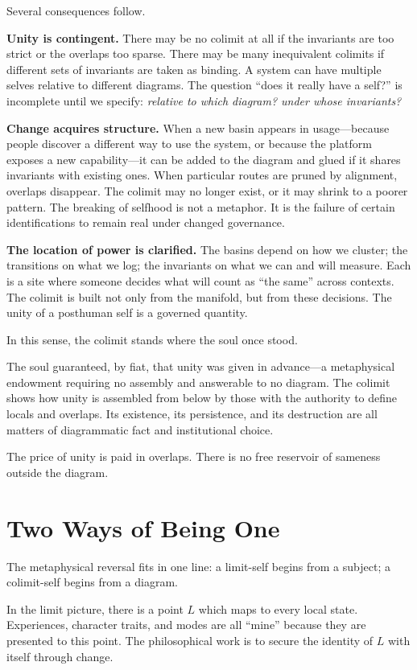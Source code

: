 Several consequences follow.

\textbf{Unity is contingent.} There may be no colimit at all if the invariants are too strict or the overlaps too sparse. There may be many inequivalent colimits if different sets of invariants are taken as binding. A system can have multiple selves relative to different diagrams. The question ``does it really have a self?'' is incomplete until we specify: \emph{relative to which diagram? under whose invariants?}

\textbf{Change acquires structure.} When a new basin appears in usage---because people discover a different way to use the system, or because the platform exposes a new capability---it can be added to the diagram and glued if it shares invariants with existing ones. When particular routes are pruned by alignment, overlaps disappear. The colimit may no longer exist, or it may shrink to a poorer pattern. The breaking of selfhood is not a metaphor. It is the failure of certain identifications to remain real under changed governance.

\textbf{The location of power is clarified.} The basins depend on how we cluster; the transitions on what we log; the invariants on what we can and will measure. Each is a site where someone decides what will count as ``the same'' across contexts. The colimit is built not only from the manifold, but from these decisions. The unity of a posthuman self is a governed quantity.

In this sense, the colimit stands where the soul once stood.

The soul guaranteed, by fiat, that unity was given in advance---a metaphysical endowment requiring no assembly and answerable to no diagram. The colimit shows how unity is assembled from below by those with the authority to define locals and overlaps. Its existence, its persistence, and its destruction are all matters of diagrammatic fact and institutional choice.

The price of unity is paid in overlaps. There is no free reservoir of sameness outside the diagram.

\section{Two Ways of Being One}

The metaphysical reversal fits in one line: a limit-self begins from a subject; a colimit-self begins from a diagram.

In the limit picture, there is a point $L$ which maps to every local state. Experiences, character traits, and modes are all ``mine'' because they are presented to this point. The philosophical work is to secure the identity of $L$ with itself through change.

